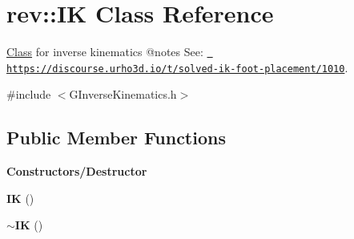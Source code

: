 \hypertarget{classrev_1_1_i_k}{}\section{rev\+::IK Class Reference}
\label{classrev_1_1_i_k}


\mbox{\hyperlink{struct_class}{Class}} for inverse kinematics @notes See\+: \href{https://discourse.urho3d.io/t/solved-ik-foot-placement/1010}{\texttt{ https\+://discourse.\+urho3d.\+io/t/solved-\/ik-\/foot-\/placement/1010}}.  




{\ttfamily \#include $<$G\+Inverse\+Kinematics.\+h$>$}

\subsection*{Public Member Functions}
\begin{Indent}\textbf{ Constructors/\+Destructor}\par
\begin{DoxyCompactItemize}
\item 
\mbox{\label{classrev_1_1_i_k_af90b240fddcd2a66dbab50186855ab8b}} 
{\bfseries IK} ()
\item 
\mbox{\label{classrev_1_1_i_k_a531fa55e74f93a0ab61eecfd6f733fd2}} 
{\bfseries $\sim$\+IK} ()
\end{DoxyCompactItemize}
\end{Indent}
